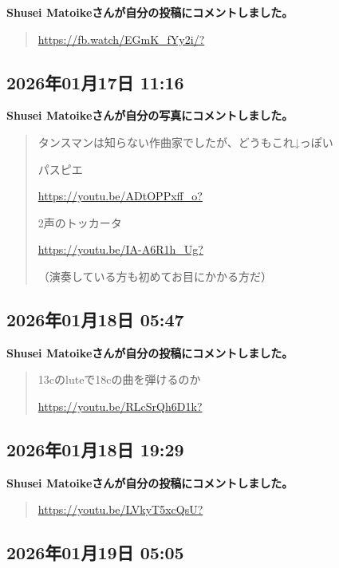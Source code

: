\textbf{Shusei Matoikeさんが自分の投稿にコメントしました。}

\begin{quote}
\url{https://fb.watch/EGmK_fYy2i/?}
\end{quote}

\subsection*{2026年01月17日 11:16}

\textbf{Shusei Matoikeさんが自分の写真にコメントしました。}

\begin{quote}
タンスマンは知らない作曲家でしたが、どうもこれ↓っぽい

パスピエ

\url{https://youtu.be/ADtOPPxff_o?}

2声のトッカータ

\url{https://youtu.be/IA-A6R1h_Ug?}

（演奏している方も初めてお目にかかる方だ）
\end{quote}

\subsection*{2026年01月18日 05:47}

\textbf{Shusei Matoikeさんが自分の投稿にコメントしました。}

\begin{quote}
13cのluteで18cの曲を弾けるのか

\url{https://youtu.be/RLcSrQh6D1k?}
\end{quote}

\subsection*{2026年01月18日 19:29}

\textbf{Shusei Matoikeさんが自分の投稿にコメントしました。}

\begin{quote}
\url{https://youtu.be/LVkyT5xcQsU?}
\end{quote}

\subsection*{2026年01月19日 05:05}

